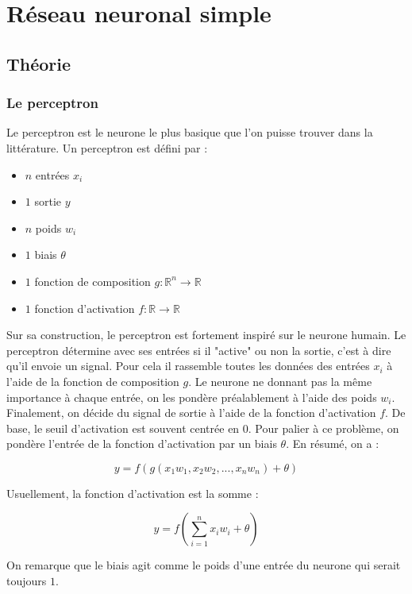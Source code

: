 \chapter{Réseau neuronal simple}

\section{Théorie}

\subsection{Le perceptron}

Le perceptron est le neurone le plus basique que l'on puisse trouver dans la littérature. Un perceptron est défini par : 
\begin{itemize}
\item $n$ entrées $x_i$
\item $1$ sortie $y$
\item $n$ poids $w_i$
\item $1$ biais $\theta$
\item $1$ fonction de composition $g : \mathbb{R}^n \to \mathbb{R}$
\item $1$ fonction d'activation $f : \mathbb{R} \to \mathbb{R}$
\end{itemize}

\vspace{\parskip}
Sur sa construction, le perceptron est fortement inspiré sur le neurone humain. Le perceptron détermine avec ses entrées si il "active" ou non la sortie, c'est à dire qu'il envoie un signal. Pour cela il rassemble toutes les données des entrées $x_i$ à l'aide de la fonction de composition $g$. Le neurone ne donnant pas la même importance à chaque entrée, on les pondère préalablement à l'aide des poids $w_i$. Finalement, on décide du signal de sortie à l'aide de la fonction d'activation $f$. De base, le seuil d'activation est souvent centrée en $0$. Pour palier à ce problème, on pondère l'entrée de la fonction d'activation par un biais $\theta$. En résumé, on a :

\[y = f(g(x_1w_1, x_2w_2, ... , x_nw_n) + \theta) \]

Usuellement, la fonction d'activation est la somme :

\[y = f(\sum_{i=1}^n x_iw_i + \theta) \]

On remarque que le biais agit comme le poids d'une entrée du neurone qui serait toujours $1$.


